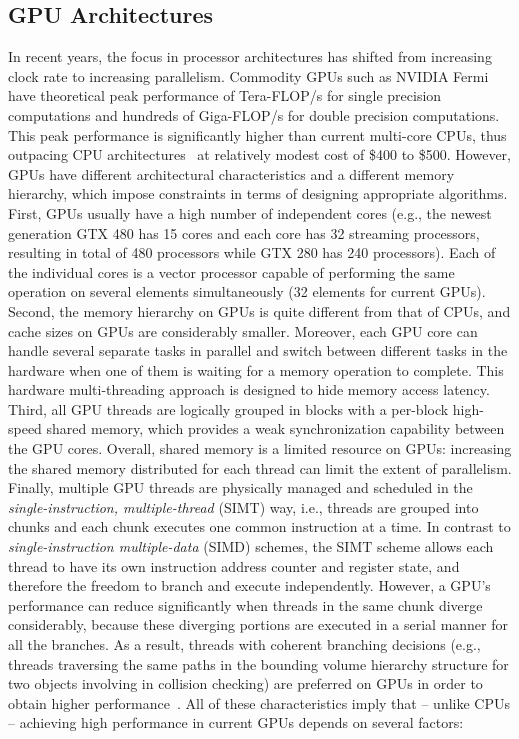 \subsection{GPU Architectures}
In recent years, the focus in processor
architectures has shifted from increasing clock rate to
increasing parallelism. Commodity GPUs such as NVIDIA Fermi
have theoretical peak performance of Tera-FLOP/s
for single precision
computations and hundreds of Giga-FLOP/s for double precision computations. This
peak performance is significantly higher than current multi-core CPUs, thus outpacing
CPU architectures~\cite{Lindholm2008} at relatively modest cost of \$400 to \$500.
However, GPUs have different architectural characteristics and a different memory hierarchy, which impose
constraints in terms of designing appropriate algorithms.
First, GPUs usually have a high number of independent cores (e.g., the newest generation GTX 480 has 15 cores and each core has
32 streaming processors, resulting in total of 480 processors while GTX 280 has 240 processors). Each of the individual cores
is a vector processor capable of performing the same operation
on several elements simultaneously (32 elements for
current GPUs). Second, the memory hierarchy on GPUs is quite different from that of CPUs, and cache sizes on GPUs are considerably smaller. Moreover, each GPU
core can handle several separate tasks in parallel and switch
between different tasks in the hardware when one of them is waiting for a
memory operation to complete. This hardware multi-threading
approach is designed to hide memory access latency. Third, all GPU threads are logically grouped in blocks with a per-block high-speed shared memory, which provides a weak synchronization capability between the GPU cores. Overall, shared memory is a limited resource on GPUs: increasing the shared memory distributed for each thread can limit the extent of parallelism. Finally, multiple GPU threads are physically managed and scheduled in
the \emph{single-instruction, multiple-thread} (SIMT) way, i.e., threads are grouped into chunks and each chunk executes one
common instruction at a time. In contrast to \emph{single-instruction multiple-data} (SIMD) schemes, the SIMT scheme allows each thread to have its own instruction address counter and register state, and therefore the freedom to branch and execute independently. However, a GPU's performance can reduce significantly when threads in the same chunk diverge considerably, because these diverging portions are executed in a serial manner for all the branches. As a result, threads with coherent branching decisions (e.g., threads traversing the same paths in the bounding volume hierarchy structure for two objects involving in collision checking) are preferred on GPUs in order to obtain higher performance~\cite{Gunther07}. All of these characteristics imply that -- unlike CPUs -- achieving high performance in current GPUs depends on several factors:
